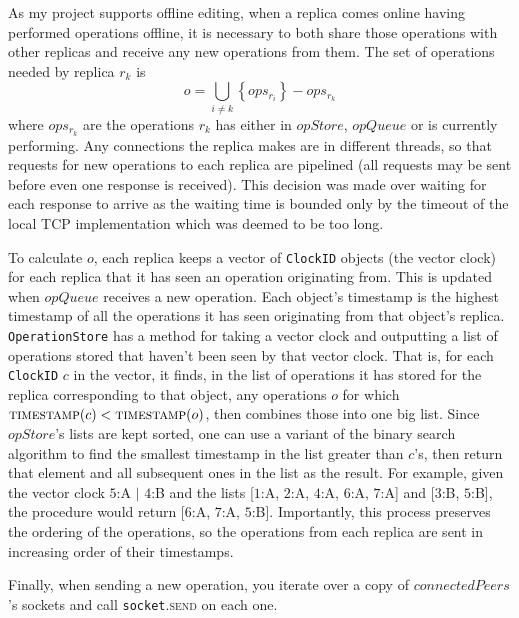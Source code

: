 \documentclass[diss.tex]{subfiles}
\begin{document}
As my project supports offline editing, when a replica comes online having performed operations offline, it is necessary to both share those operations with other replicas and receive any new operations from them. The set of operations needed by replica $r_k$ is $$o = \bigcup_{i\neq k} \left\{ops_{r_i}\right\} - ops_{r_k}$$ where $ops_{r_k}$ are the operations $r_k$ has either in $opStore$, $opQueue$ or is currently performing. Any connections the replica makes are in different threads, so that requests for new operations to each replica are pipelined (all requests may be sent before even one response is received). This decision was made over waiting for each response to arrive as the waiting time is bounded only by the timeout of the local TCP implementation which was deemed to be too long.

To calculate $o$, each replica keeps a vector of \texttt{ClockID} objects (the vector clock) for each replica that it has seen an operation originating from. This is updated when $opQueue$ receives a new operation. Each object's timestamp is the highest timestamp of all the operations it has seen originating from that object's replica. \texttt{OperationStore} has a method for taking a vector clock and outputting a list of operations stored that haven't been seen by that vector clock. That is, for each \texttt{ClockID} $c$ in the vector, it finds, in the list of operations it has stored for the replica corresponding to that object, any operations $o$ for which $\textsc{timestamp}(c) < \textsc{timestamp}(o)$, then combines those into one big list. Since $opStore$'s lists are kept sorted, one can use a variant of the binary search algorithm to find the smallest timestamp in the list greater than $c$'s, then return that element and all subsequent ones in the list as the result. For example, given the vector clock $5$:A $|$ $4$:B and the lists [$1$:A, $2$:A, $4$:A, $6$:A, $7$:A] and [$3$:B, $5$:B], the procedure would return [$6$:A, $7$:A, $5$:B]. Importantly, this process preserves the ordering of the operations, so the operations from each replica are sent in increasing order of their timestamps. 

Finally, when sending a new operation, you iterate over a copy of $connectedPeers$'s sockets and call \texttt{socket}.\textsc{send} on each one.
\end{document}

